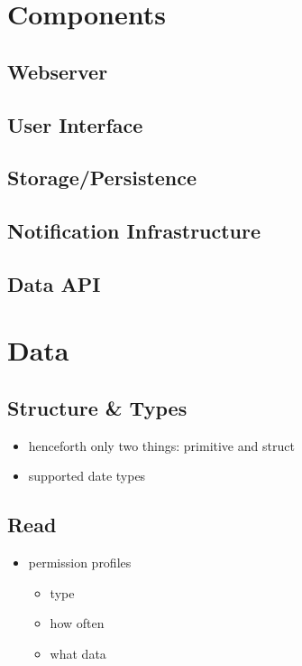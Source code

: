 \documentclass[12pt,english,a4paper,titlepage,cleardoublepage=empty,dottedtoc]{report}
\providecommand{\tightlist}{%
  \setlength{\itemsep}{0pt}\setlength{\parskip}{0pt}}
\begin{document}
\section{Components}\label{components}

\subsection{Webserver}\label{webserver}

\subsection{User Interface}\label{user-interface}

\subsection{Storage/Persistence}\label{storagepersistence}

\subsection{Notification
Infrastructure}\label{notification-infrastructure}

\subsection{Data API}\label{data-api}

\section{Data}\label{data-1}

\subsection{Structure \& Types}\label{structure-types}

\begin{itemize}
\tightlist
\item
  henceforth only two things: primitive and struct
\item
  supported date types
\end{itemize}

\subsection{Read}\label{read}

\begin{itemize}
\tightlist
\item
  permission profiles

  \begin{itemize}
  \tightlist
  \item
    type
  \item
    how often
  \item
    what data
  \end{itemize}
\end{itemize}
\end{document}
